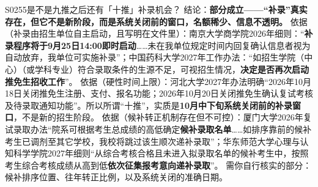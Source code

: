 \begin{qa}{S0255}{是不是九推之后还有「十推」补录机会？}
结论：\textbf{部分成立——“补录”真实存在，但它不是新阶段，而是系统关闭前的窗口，名额稀少、信息不透明。}
依据（补录由招生单位自主启动，且写明在文件里）：南京大学商学院2026年细则：“\textbf{补录程序将于9月25日14:00即时启动}……未在我单位规定时间内回复确认信息者视为自动放弃，我单位可实施补录”；中国药科大学2027年工作办法：“如招生学院（中心）（或学科专业）符合录取条件的生源不足，可视招生情况，\textbf{决定是否再次启动推免生招收工作}”。
依据（硬性时间上限）：河北大学2027年办法明确“2026年10月18日关闭推免生注册、支付、报名功能；2026年10月20日关闭推免生确认复试考核及待录取通知功能”。所以所谓“十推”，实质是\textbf{10月中下旬系统关闭前的补录窗口}，不是新的招生阶段。
依据（候补转正机制存在但不可控）：厦门大学2026年复试录取办法“院系可根据考生总成绩的高低确定\textbf{候补录取名单}……如排序靠前的候补考生已调剂至其它学校，我校将跳过该生顺次递补录取”；华东师范大学心理与认知科学学院2027年细则“从综合考核合格且未进入拟录取名单的候补考生中，按照考生综合考核成绩从高到低\textbf{依次征集报考意向递补录取}”。
需你自行核实的部分：候补排序位置、往年转正比例，以及系统关闭的准确日期。
\end{qa}

